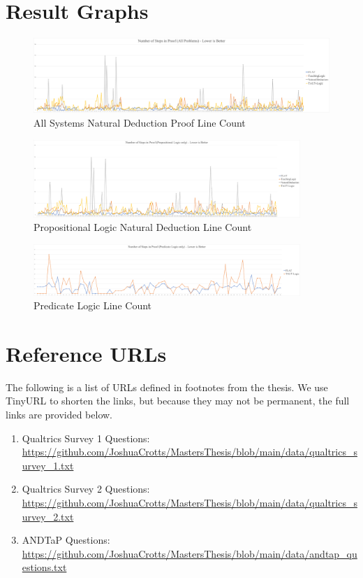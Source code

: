 \documentclass[ms]{uncgdissertationexp2}
\theoremstyle{plain}
\theoremstyle{definition}
\theoremstyle{remark}
\begin{document}
\chapter{Result Graphs}

\begin{figure}
	\centering
	\includegraphics[width=1\textwidth]{all-proofs-graph.png}
	\caption{All Systems Natural Deduction Proof Line Count}
	\label{fig:allproofsgraph}
\end{figure} 

\begin{figure}[ht]
	\centering
	\includegraphics[width=0.9\textwidth]{prop-graph.png}
	\caption{Propositional Logic Natural Deduction Line Count}
	\label{fig:propgraph}
\end{figure} 

\begin{figure}[ht]
	\centering
	\includegraphics[width=0.9\textwidth]{pred-graph.png}
	\caption{Predicate Logic Line Count}
	\label{fig:predgraph}
\end{figure} 

\chapter{Reference URLs}

The following is a list of URLs defined in footnotes from the thesis. We use TinyURL to shorten the links, but because they may not be permanent, the full links are provided below.

\begin{enumerate}
    \item Qualtrics Survey 1 Questions: \url{https://github.com/JoshuaCrotts/MastersThesis/blob/main/data/qualtrics_survey_1.txt}
    
    \item Qualtrics Survey 2 Questions:
    \url{https://github.com/JoshuaCrotts/MastersThesis/blob/main/data/qualtrics_survey_2.txt}
    
    \item ANDTaP Questions:
    \url{https://github.com/JoshuaCrotts/MastersThesis/blob/main/data/andtap_questions.txt}
\end{enumerate}


\backmatter
\end{document}
